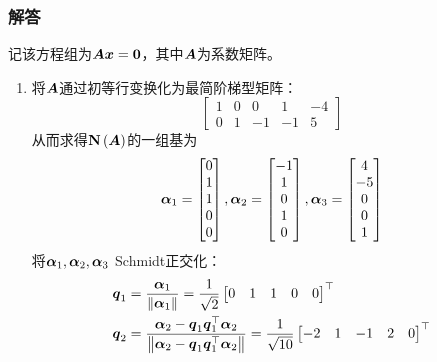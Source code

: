 \documentclass{beamer}
\begin{document}
\begin{frame}[allowframebreaks]
    \frametitle{解答}
    记该方程组为\(\boldsymbol{A}\boldsymbol{x}=\boldsymbol{0}\)，其中\(\boldsymbol{A}\)为系数矩阵。
    \begin{enumerate}
        \item {
              将\(\boldsymbol{A}\)通过初等行变换化为最简阶梯型矩阵：
              \begin{equation*}
                  \begin{bmatrix}
                      1 & 0 & 0  & 1  & -4 \\
                      0 & 1 & -1 & -1 & 5
                  \end{bmatrix}
              \end{equation*}
              从而求得\(\boldsymbol{\mathrm{N}}\left( \boldsymbol{A} \right)\)的一组基为
              \begin{equation*}
                  \boldsymbol{\alpha}_1=\begin{bmatrix}0\\1\\1\\0\\0\end{bmatrix},
                  \boldsymbol{\alpha}_2=\begin{bmatrix}-1\\1\\0\\1\\0\end{bmatrix},
                  \boldsymbol{\alpha}_3=\begin{bmatrix}4\\-5\\0\\0\\1\end{bmatrix}
              \end{equation*}
              将\(\boldsymbol{\alpha}_1,\boldsymbol{\alpha}_2,\boldsymbol{\alpha}_3\) Schmidt正交化：
              \begin{align*}
                  \vecq_1 & =\frac{\vecal_1}{\Abs{\vecal_1}}=\frac{1}{\sqrt2}\begin{bmatrix}0&1&1&0&0\end{bmatrix}^\top                                                                                                                      \\
                  \vecq_2 & =\frac{\vecal_2-\vecq_1\vecq_1^\top\vecal_2}{\Abs{\vecal_2-\vecq_1\vecq_1^\top\vecal_2}}=\frac{1}{\sqrt{10}}\begin{bmatrix}-2&1&-1&2&0\end{bmatrix}^\top                                                         \\

\end{align*}}
\end{enumerate}
\end{frame}
\end{document}
